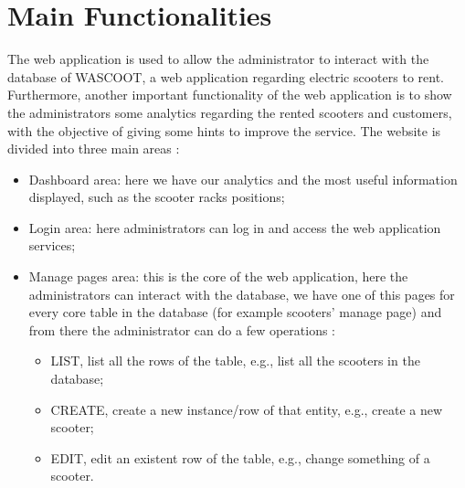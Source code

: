 \section{Main Functionalities}
The web application is used to allow the administrator to interact with the database of WASCOOT, a web application regarding electric scooters to rent.
Furthermore, another important functionality of the web application  is to show the administrators some analytics regarding the rented scooters and customers, with the objective of giving some hints to improve the service. The website is divided into three main areas :
\begin{itemize}
    \item Dashboard area: here we have our analytics and the most useful information displayed, such as the scooter racks positions;
    \item Login area: here administrators can log in and access the web application services;
    \item Manage pages area: this is the core of the web application, here the administrators can interact with the database, we have one of this pages for every core table in the database (for example scooters' manage page) and from there the administrator can do a few operations :
    \begin{itemize}
        \item LIST, list all the rows of the table, e.g., list all the scooters in the database;
        \item CREATE, create a new instance/row of that entity, e.g., create a new scooter;
        \item EDIT, edit an existent row of the table, e.g., change something of a scooter.
    \end{itemize}
\end{itemize}